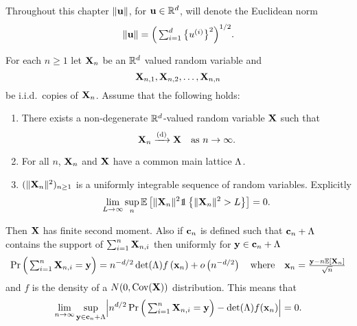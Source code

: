 Throughout this chapter $\lVert{\mathbf u}\rVert$, for ${\mathbf u} \in {\mathbb R}^d$, will denote the Euclidean norm
\begin{equation*}
    \lVert{\mathbf u}\rVert = \Big( \textstyle \sum_{i=1}^d \big\{ u^{(i)} \big\}^2 \Big)^{1/2}.
\end{equation*}

\begin{theorem}
    \label{thm:multi-triangular-llt}
    For each $n \geq 1$ let ${\mathbf X}_n$ be an ${\mathbb R}^d$ valued random variable and
    \begin{equation*}
        {\mathbf X}_{n, 1}, {\mathbf X}_{n, 2}, \ldots, {\mathbf X}_{n, n}  
    \end{equation*}
    be i.i.d.\ copies of ${\mathbf X}_n$. Assume that the following holds:
    \begin{enumerate}
        \item There exists a non-degenerate ${\mathbb R}^d$-valued random variable ${\mathbf X}$ such that
            \begin{equation*}
                {\mathbf X}_n \xrightarrow[]{\text{(d)}} {\mathbf X} \quad \text{as $n \to \infty$.}
            \end{equation*} 
        \item For all $n$, ${\mathbf X}_n$ and ${\mathbf X}$ have a common main lattice $\Lambda$.
        \item $(\lVert{\mathbf X}_n\rVert^2)_{n \geq 1}$ is a uniformly integrable sequence of random variables. Explicitly
            \begin{equation}
                \label{eq:ui-condition}
                \lim_{L \to \infty} \sup_n \E\left[
                    \norm{\vX_n}^2
                    \one \left\{ \norm{\vX_n}^2 > L \right\}
                \right] = 0.
            \end{equation}
    \end{enumerate}
    Then ${\mathbf X}$ has finite second moment. Also if ${\mathbf c}_n$ is defined such that ${\mathbf c}_n + \Lambda$ contains the support of $\sum_{i=1}^n {\mathbf X}_{n, i}$ then uniformly for ${\mathbf y} \in {\mathbf c}_n + \Lambda$
    \begin{equation*}
        \Pr\Big(
            \textstyle \sum_{i=1}^n {\mathbf X}_{n, i} = {\mathbf y}
        \Big)
        = n^{-d/2} \det(\Lambda) f\left( {\mathbf x}_n \right) + o \left( n^{-d/2} \right)
        \quad \text{where} \quad
        {\mathbf x}_n = \frac{{\mathbf y} - n {\mathbb E}[{\mathbf X}_n]}{\sqrt{n}}
    \end{equation*}
    and $f$ is the density of a $N(0, \operatorname{Cov}({\mathbf X}))$ distribution. This means that
    \begin{equation*}
        \lim_{n \to \infty} \sup_{\vy \in \vc_n + \lattice} \abs*{
            n^{d/2} \Pr\Big( \textstyle \sum_{i=1}^n \vX_{n, i} = \vy \Big)
            - \det(\lattice) f(\vx_n)
        } = 0.
    \end{equation*}
\end{theorem}

